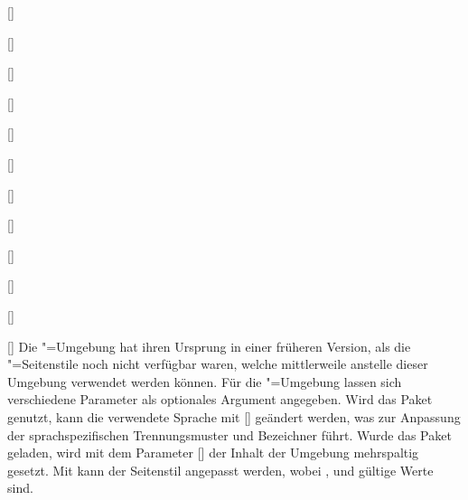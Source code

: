 \begin{Declaration*}{}
\begin{Declaration*}{}
\begin{Declaration*}{}
\begin{Declaration}{[]}
\begin{Declaration}{[]}
\begin{Declaration}{[]}
\begin{Declaration}[v2.02]{[\PSet]}
\begin{Declaration}{[\PSet]}{%
}
\begin{Declaration}[v2.03]{[\PSet]}{%
}
\begin{Declaration}[v2.03]{[\PSet]}{%
}
\begin{Declaration}{[]}{%
}
\begin{Declaration}[v2.03]{%
  []
}{}
\begin{Declaration}[v2.02]{[\PSet]}{%
}
\begin{Declaration}[v2.02]{[\PSet]}{%
}
\begin{Declaration}[v2.02]{[\PSet]}{%
}
\printdeclarationlist%
%
%
%
%
Die "=Umgebung hat ihren Ursprung in einer früheren 
Version, als die "=Seitenstile noch nicht verfügbar 
waren, welche mittlerweile anstelle dieser Umgebung verwendet werden können.
Für die "=Umgebung lassen sich verschiedene Parameter als 
optionales Argument angegeben. Wird das Paket  genutzt, kann die 
verwendete Sprache mit [] 
geändert werden, was zur Anpassung der sprachspezifischen Trennungsmuster und 
Bezeichner führt. Wurde das Paket  geladen, wird mit dem 
Parameter [] der Inhalt der 
Umgebung mehrspaltig gesetzt. Mit  kann 
der Seitenstil angepasst werden, wobei ,  und 
 gültige Werte sind. 


\end{Declaration}
\end{Declaration}
\end{Declaration}
\end{Declaration}
\end{Declaration}
\end{Declaration}
\end{Declaration}
\end{Declaration}
\end{Declaration}
\end{Declaration}
\end{Declaration}
\end{Declaration}
\end{Declaration*}
\end{Declaration*}
\end{Declaration*}
